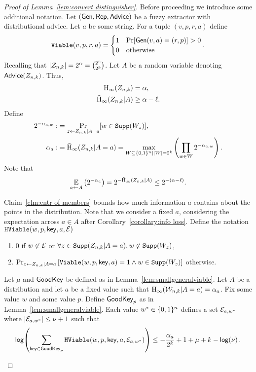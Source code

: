 \begin{proof}[Proof of Lemma~\ref{lem:convert distinguisher}]
Before proceeding we introduce some additional notation.
 Let $({\mathsf{Gen}}, {\mathsf{Rep}}, {\mathsf{Advice}})$ be a fuzzy extractor with distributional advice. Let $a$ be some string.  For a tuple $(v, p, r, a)$ define 
\[
\mathtt{Viable}(v, p, r,a) = \begin{cases} 1& \Pr[{\mathsf{Gen}}(v, a) = (r, p)]>0\\0&\text{otherwise}\end{cases}.\]
 Recalling that $|\mathcal{Z}_{n,k}| = 2^\alpha = {2^n\choose 2^k}$.  Let $A$ be a random variable denoting ${\mathsf{Advice}}(Z_{n,k})$.  Thus,  
\begin{align*}
\mathrm{H}_\infty(Z_{n,k})&=\alpha,\\
\tilde{\mathrm{H}}_\infty(Z_{n,k}|A)&\ge \alpha - \ell.
\end{align*}
Define 
\begin{align*}
2^{-\alpha_{a,w}}:&=\Pr_{z\leftarrow Z_{n,k} | A=a}[w\in \mathtt{Supp}(W_z)],\\
\alpha_a:&=\tilde{\mathrm{H}}_\infty(Z_{n,k}|A=a)=\max_{W\subseteq \{0, 1\}^n | |W|=2^k}\left(\prod_{w\in W} 2^{-\alpha_{a,w}} \right).
\end{align*}  
 Note that \[\operatorname*{\mathbb{E}}_{a\leftarrow A} \left(2^{-\alpha_a} \right) =2^{-\tilde{\mathrm{H}}_\infty(Z_{n,k}|A)}\le 2^{-(\alpha-\ell)}.\] 

Claim~\ref{clm:entr of members} bounds how much information $a$ contains about the points in the distribution.  Note that we consider a fixed $a$, considering the expectation across $a\in A$ after Corollary~\ref{corollary:info loss}.   Define the notation
$\mathtt{HViable}(w, p, \mathsf{key}, a, \mathcal{E})$
\begin{enumerate}
\item 
$0$ if $ w\not\in \mathcal{E}$ or $\forall z\in\mathtt{Supp}(Z_{n,k}|A=a), w\not\in\mathtt{Supp}(W_z)$,
\item $
\Pr_{z\leftarrow Z_{n,k} |A =a}\left[\mathtt{Viable}(w, p, \mathsf{key}, a) = 1 \wedge w\in \mathtt{Supp}(W_z)\right]$ otherwise.
\end{enumerate}

\begin{claim}
Let $\mu$ and $\mathsf{GoodKey}$ be defined as in Lemma~\ref{lem:smallgeneralviable}.
Let $A$ be a distribution and let $a$ be a fixed value such that $\mathrm{H}_\infty(\mathcal{W}_{n,k}|A=a) =\alpha_a$.  Fix some value $w$ and some value $p$. Define $\mathsf{GoodKey}_p$ as in Lemma~\ref{lem:smallgeneralviable}.  Each value $w^*\in\{0, 1\}^n$ defines a set $\mathcal{E}_{a, w^*}$ where $|\mathcal{E}_{a,w^*}| \le \nu+1$ such that
\begin{align*}
\mathsf{log}\!\left(\sum_{\mathsf{key}\in\mathsf{GoodKey}_p}\mathtt{HViable}(w, p, \mathsf{key},a, \mathcal{E}_{a,w^*})\right)\le -\frac{\alpha_a}{2^k}+1+\mu+k-\mathsf{log}\!\left(\nu\right).
\end{align*}


\end{claim}
\end{proof}
